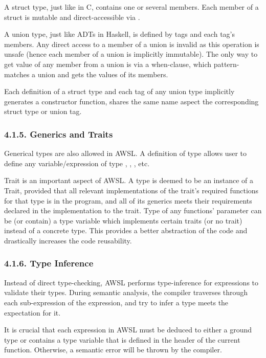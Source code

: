 \documentclass[10pt,a4paper,]{report}
\begin{document}
  A struct type, just like  in C, contains one or several
  members. Each member of a struct is mutable and direct-accessible via
  .

  A union type, just like ADTs in Haskell, is defined by tags and each tag's
  members. Any direct access to a member of a union is invalid as this operation
  is unsafe (hence each member of a union is implicitly immutable). The only way
  to get value of any member from a union is via a when-clause, which
  pattern-matches a union and gets the values of its members.

  Each definition of a struct type and each tag of any union type implicitly
  generates a constructor function, shares the same name aspect the
  corresponding struct type or union tag.

  \subsubsection*{4.1.5. Generics and Traits}
  Generical types are also allowed in AWSL. A definition of type
   allows user to define any variable/expression 
  of type , ,
  , etc.

  Trait is an important aspect of AWSL. A type is deemed to be an instance of a
  Trait, provided that all relevant implementations of the trait's required
  functions for that type is in the program, and all of its generics meets their
  requirements declared in the implementation to the trait. Type of any
  functions' parameter can be (or contain) a type variable which implements
  certain traits (or no trait) instead of a concrete type. This provides a
  better abstraction of the code and drastically increases the code reusability. 

  \subsubsection*{4.1.6. Type Inference}
  Instead of direct type-checking, AWSL performs type-inference for expressions
  to validate their types. During semantic analysis, the compiler traverses
  through each sub-expression of the expression, and try to infer a type meets
  the expectation for it. 

  It is crucial that each expression in AWSL must be deduced to either a ground
  type or contains a type variable that is defined in the header of the current
  function. Otherwise, a semantic error will be thrown by the compiler.
\end{document}
